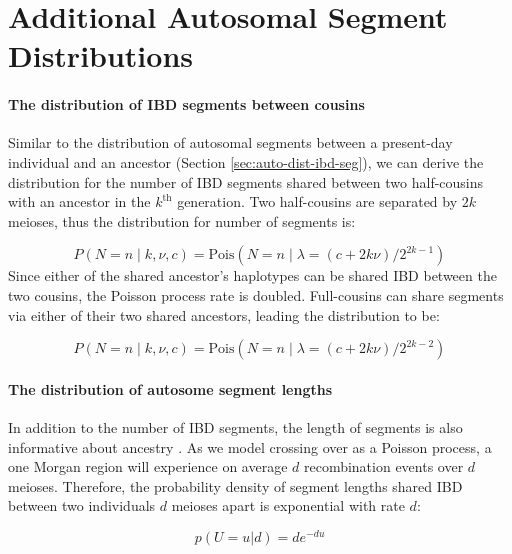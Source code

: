 \documentclass[11pt]{article}
\begin{document}
\section{Additional Autosomal Segment Distributions}
\label{ap:auto-cousin}
\paragraph{The distribution of IBD segments between cousins}

Similar to the distribution of autosomal segments between a present-day
individual and an ancestor (Section \ref{sec:auto-dist-ibd-seg}), we can derive
the distribution for the number of IBD segments shared between two half-cousins
with an ancestor in the $k^\text{th}$ generation. Two half-cousins are
separated by $2k$ meioses, thus the distribution for number of segments is:

\begin{equation} \label{eq:auto-seg-cousins}
 P(N=n \;|\; k, \nu, c) = \text{Pois}\left(N = n \;|\; \lambda=(c + 2 k \nu)/2^{2 k - 1} \right)
\end{equation}
%
Since either of the shared ancestor's haplotypes can be shared IBD between the
two cousins, the Poisson process rate is doubled. Full-cousins can share segments
via either of their two shared ancestors, leading the distribution to be:

\begin{equation}
  P(N=n \;|\; k, \nu, c) = \text{Pois}\left(N = n \;|\; \lambda=(c + 2 k \nu)/2^{2 k - 2} \right)
\end{equation}


\paragraph{The distribution of autosome segment lengths}

In addition to the number of IBD segments, the length of segments is also
informative about ancestry \citep[e.g.][]{palamara2012length}. As we model
crossing over as a Poisson process, a one Morgan region will experience on
average $d$ recombination events over $d$ meioses. Therefore, the probability
density of segment lengths shared IBD between two individuals $d$ meioses apart
is exponential with rate $d$:

\begin{equation}
  \label{eq:auto-seg-lens}
  p(U=u | d) = d e^{-du}
\end{equation}
\end{document}
